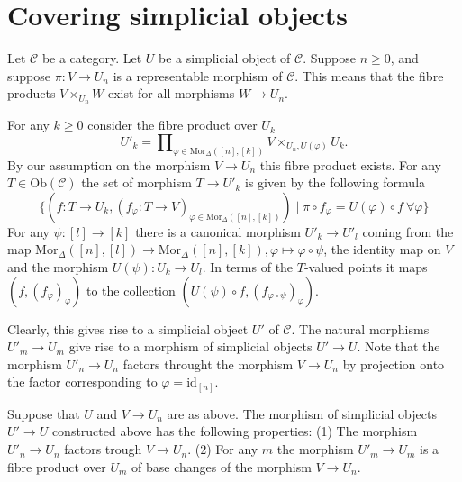 \noindent

\begin{lemma}
\label{lemma-compare-two}


\end{lemma}
















\section{Covering simplicial objects}
\label{section-making-simplicial}

\noindent
Let $\mathcal{C}$ be a category.
Let $U$ be a simplicial object of $\mathcal{C}$.
Suppose $n\geq 0$, and suppose $\pi : V \to U_n$ is
a representable morphism of $\mathcal{C}$. This
means that the fibre products $V \times_{U_n} W$
exist for all morphisms $W \to U_n$.

\medskip\noindent
For any $k \geq 0$ consider the fibre product over $U_k$
$$
U'_k = \prod\nolimits_{\varphi \in \text{Mor}_\Delta([n],[k])}
V\times_{U_n, U(\varphi)} U_k.
$$
By our assumption on the morphism $V \to U_n$ this fibre product
exists. For any $T \in \text{Ob}(\mathcal{C})$ the set of morphism
$T \to U'_k$ is given by the following formula
$$ 
\{
(f : T \to U_k, (f_\varphi : T \to V)_{\varphi \in \text{Mor}_\Delta([n],[k])})
\mid
\pi \circ f_{\varphi} = U(\varphi) \circ f\ \forall \varphi
\}
$$
For any $\psi : [l] \to [k]$ there is a canonical morphism
$U'_k \to U'_l$ coming from the map $\text{Mor}_\Delta([n],[l])
\to \text{Mor}_\Delta([n],[k]), \varphi \mapsto \varphi \circ \psi$,
the identity map on $V$ and the morphism
$U(\psi) : U_k \to U_l$. In terms of the $T$-valued points
it maps $(f, (f_\varphi)_\varphi)$ to the collection
$(U(\psi) \circ f, (f_{\varphi \circ \psi})_{\varphi})$.

\medskip\noindent
Clearly, this gives rise to a simplicial object $U'$ of
$\mathcal{C}$. The natural morphisms $U'_m \to U_m$ give rise to a
morphism of simplicial objects $U' \to U$. Note that
the morphism $U'_n \to U_n$ factors throught the morphism $V \to U_n$
by projection onto the factor corresponding to $\varphi=\text{id}_{[n]}$.

\begin{lemma}
\label{lemma-construct-new-covers}
Suppose that $U$ and $V\to U_n$ are as above.
The morphism of simplicial objects 
$U' \to U$ constructed above has the following 
properties:
(1) The morphism $U'_n \to U_n$ factors trough $V \to U_n$.
(2) For any $m$ the morphism $U'_m \to U_m$
is a fibre product over $U_m$ of base changes
of the morphism $V \to U_n$.
\end{lemma}


















